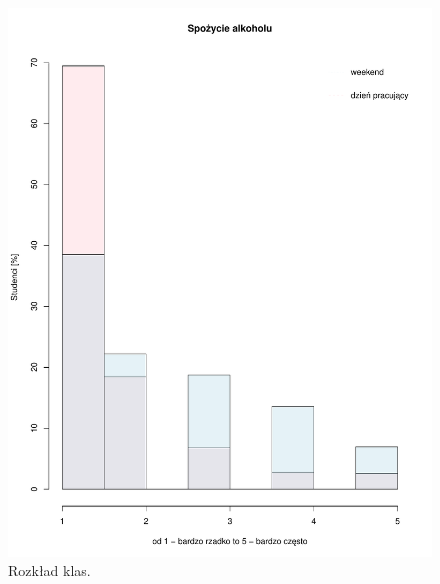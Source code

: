 \begin{figure}[h]

 \centering 
 \includegraphics[scale=0.30]{tex/alc.pdf}
\caption{Rozkład klas.}
 \label{fig:classes}
\end{figure}
